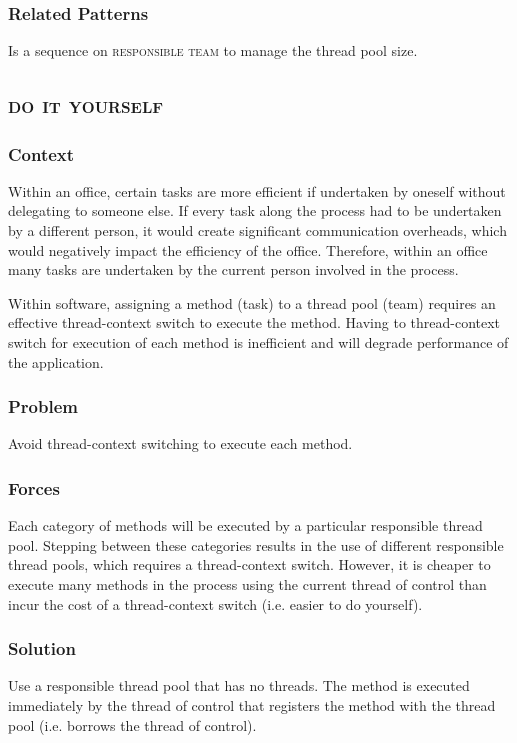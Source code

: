 \documentclass[prodmode]{style/acmlarge}
\begin{document}
\subsubsection*{Related Patterns} Is a sequence on \textsc{responsible team} to
manage the thread pool size.



\subsection{\textsc{\textbf{do it yourself}}}

\subsubsection*{Context} Within an office, certain tasks are more efficient if
undertaken by oneself without delegating to someone else.  If every task along
the process had to be undertaken by a different person, it would create
significant communication overheads, which would negatively impact the
efficiency of the office.  Therefore, within an office many tasks are undertaken
by the current person involved in the process.

Within software, assigning a method (task) to a thread pool (team) requires an
effective thread-context switch to execute the method.  Having to thread-context
switch for execution of each method is inefficient and will degrade performance
of the application.

\subsubsection*{\textbf{Problem}} Avoid thread-context switching to execute each method.

\subsubsection*{Forces} Each category of methods will be executed by a
particular responsible thread pool.  Stepping between these categories results
in the use of different responsible thread pools, which requires a
thread-context switch.  However, it is cheaper to execute many methods in the
process using the current thread of control than incur the cost of a
thread-context switch (i.e. easier to do yourself).

\subsubsection*{\textbf{Solution}} Use a responsible thread pool that has no threads.
The method is executed immediately by the thread of control that registers the
method with the thread pool (i.e. borrows the thread of control).
\end{document}
